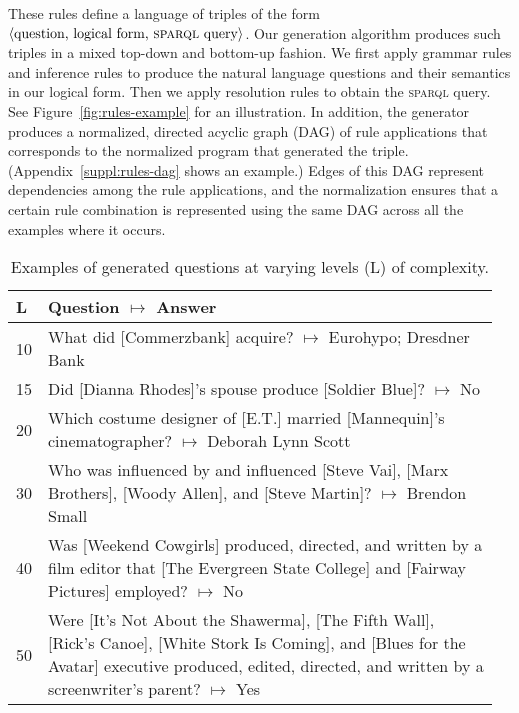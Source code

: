 \documentclass[letterpaper]{article}
\newcommand{\SPARQL}{\textsc{sparql}}
\begin{document}
These rules define a language of triples of the form $\langle \text{question, logical form, \SPARQL{} query} \rangle$. Our generation algorithm produces such triples in a mixed top-down and bottom-up fashion. We first apply grammar rules and inference rules to produce the natural language questions and their semantics in our logical form. Then we apply resolution rules to obtain the \SPARQL{} query. See Figure~\ref{fig:rules-example} for an illustration.
In addition, the generator produces a normalized, directed acyclic graph (DAG) of rule applications that corresponds to the normalized program that generated the triple. (Appendix~\ref{suppl:rules-dag} shows an example.) Edges of this DAG represent dependencies among the rule applications, and the normalization ensures that a certain rule combination is represented using the same DAG across all the examples where it occurs.

\begin{table}[b]
    \caption{Examples of generated questions at varying levels (L) of complexity.}
    \label{tab:examples-complexity}
    \centering \small
    \begin{tabular}{@{}l@{~~}p{0.96\linewidth}@{}}
        \hline
        L & Question $\mapsto$ Answer \\
        \hline
        \hline
        10 & What did [Commerzbank] acquire? $\mapsto$ Eurohypo; Dresdner Bank \\ 
        15 & Did [Dianna Rhodes]'s spouse produce [Soldier Blue]? $\mapsto$ No\\
        20 & Which costume designer of [E.T.] married [Mannequin]'s cinematographer? $\mapsto$ Deborah Lynn Scott\\ 
        30 & Who was influenced by and influenced [Steve Vai], [Marx Brothers], [Woody Allen], and [Steve Martin]? $\mapsto$ Brendon Small\\ 
        40 & Was [Weekend Cowgirls] produced, directed, and written by a film editor that [The Evergreen State College] and [Fairway Pictures] employed? $\mapsto$ No\\ 
        50 & Were [It's Not About the Shawerma], [The Fifth Wall], [Rick's Canoe], [White Stork Is Coming], and [Blues for the Avatar] executive produced, edited, directed, and written by a screenwriter's parent? $\mapsto$ Yes\\ 
        \hline
    \end{tabular}
\end{table}
\end{document}
